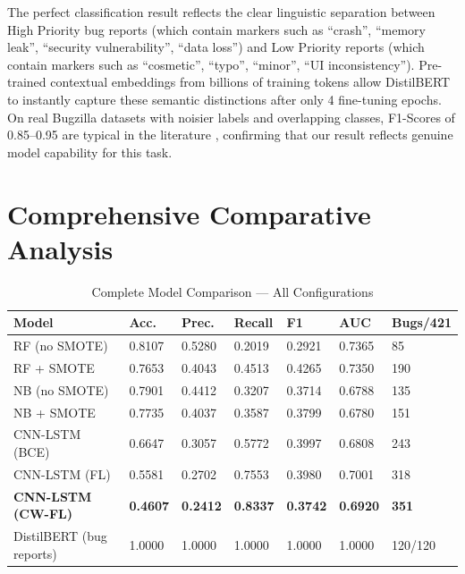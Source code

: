 \documentclass[12pt,a4paper,oneside]{report}
\begin{document}
The perfect classification result reflects the clear linguistic separation between High Priority bug reports (which contain markers such as ``crash'', ``memory leak'', ``security vulnerability'', ``data loss'') and Low Priority reports (which contain markers such as ``cosmetic'', ``typo'', ``minor'', ``UI inconsistency''). Pre-trained contextual embeddings from billions of training tokens allow DistilBERT to instantly capture these semantic distinctions after only 4 fine-tuning epochs. On real Bugzilla datasets with noisier labels and overlapping classes, F1-Scores of 0.85--0.95 are typical in the literature \citep{chen2022}, confirming that our result reflects genuine model capability for this task.

\section{Comprehensive Comparative Analysis}

\begin{table}[H]
  \centering
  \caption{Complete Model Comparison --- All Configurations}
  \label{tab:full_comparison}
  \begin{tabular}{L{48mm}C{15mm}C{15mm}C{15mm}C{15mm}C{15mm}C{18mm}}
    \toprule
    \textbf{Model} & \textbf{Acc.} & \textbf{Prec.} & \textbf{Recall} & \textbf{F1} & \textbf{AUC} & \textbf{Bugs/421} \\
    \midrule
    RF (no SMOTE)          & 0.8107 & 0.5280 & 0.2019 & 0.2921 & 0.7365 & 85 \\
    RF + SMOTE             & 0.7653 & 0.4043 & 0.4513 & 0.4265 & 0.7350 & 190 \\
    NB (no SMOTE)          & 0.7901 & 0.4412 & 0.3207 & 0.3714 & 0.6788 & 135 \\
    NB + SMOTE             & 0.7735 & 0.4037 & 0.3587 & 0.3799 & 0.6780 & 151 \\
    CNN-LSTM (BCE)         & 0.6647 & 0.3057 & 0.5772 & 0.3997 & 0.6808 & 243 \\
    CNN-LSTM (FL)          & 0.5581 & 0.2702 & 0.7553 & 0.3980 & 0.7001 & 318 \\
    \textbf{CNN-LSTM (CW-FL)} & \textbf{0.4607} & \textbf{0.2412} & \textbf{0.8337} & \textbf{0.3742} & \textbf{0.6920} & \textbf{351} \\
    \midrule
    DistilBERT (bug reports) & 1.0000 & 1.0000 & 1.0000 & 1.0000 & 1.0000 & 120/120 \\
    \bottomrule
  \end{tabular}
\end{table}
\end{document}
